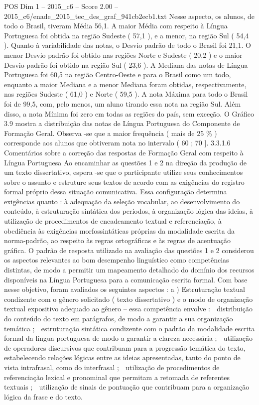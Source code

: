 \begin{textsample}{POS Dim 1 – 2015\_c6 – Score 2.00 – 2015\_c6/enade\_2015\_tec\_des\_graf\_941cb2ecb1.txt}
Nesse aspecto, os alunos, de todo o Brasil, tiveram Média 56,1.
A maior Média com respeito à Língua Portuguesa foi obtida na região Sudeste ( 57,1 ), e a menor, na região Sul ( 54,4 ).
Quanto à variabilidade das notas, o Desvio padrão de todo o Brasil foi 21,1.
O menor Desvio padrão foi obtido nas regiões Norte e Sudeste ( 20,2 ) e o maior Desvio padrão foi obtido na região Sul ( 23,6 ).
A Mediana das notas de Língua Portuguesa foi 60,5 na região Centro-Oeste e para o Brasil como um todo, enquanto a maior Mediana e a menor Mediana foram obtidas, respectivamente, nas regiões Sudeste ( 61,0 ) e Norte ( 59,5 ).
A nota Máxima para todo o Brasil foi de 99,5, com, pelo menos, um aluno tirando essa nota na região Sul.
Além disso, a nota Mínima foi zero em todas as regiões do país, sem exceção.
O Gráfico 3.9 mostra a distribuição das notas de Língua Portuguesa do Componente de Formação Geral.
Observa -se que a maior frequência ( mais de 25 \% ) corresponde aos alunos que obtiveram nota no intervalo ( 60 ; 70 ]. 3.3.1.6 Comentários sobre a correção das respostas de Formação Geral com respeito à Língua Portuguesa Ao encaminhar as questões 1 e 2 na direção da produção de um texto dissertativo, espera -se que o participante utilize seus conhecimentos sobre o assunto e estruture seus textos de acordo com as exigências do registro formal próprio dessa situação comunicativa.
Essa configuração determina exigências quanto : à adequação da seleção vocabular, ao desenvolvimento do conteúdo, à estruturação sintática dos períodos, à organização lógica das ideias, à utilização de procedimentos de encadeamento textual e referenciação, à obediência às exigências morfossintáticas próprias da modalidade escrita da norma-padrão, ao respeito às regras ortográficas e às regras de acentuação gráfica.
O padrão de resposta utilizado na avaliação das questões 1 e 2 considerou os aspectos relevantes ao bom desempenho linguístico como competências distintas, de modo a permitir um mapeamento detalhado do domínio dos recursos disponíveis na Língua Portuguesa para a comunicação escrita formal.
Com base nesse objetivo, foram avaliados os seguintes aspectos : a ) Estruturação textual condizente com o gênero solicitado ( texto dissertativo ) e o modo de organização textual expositivo adequado ao gênero – essa competência envolve :  distribuição do conteúdo do texto em parágrafos, de modo a garantir a sua organização temática ;  estruturação sintática condizente com o padrão da modalidade escrita formal da língua portuguesa de modo a garantir a clareza necessária ;  utilização de operadores discursivos que contribuam para a progressão temática do texto, estabelecendo relações lógicas entre as ideias apresentadas, tanto do ponto de vista intrafrasal, como do interfrasal ;  utilização de procedimentos de referenciação lexical e pronominal que permitam a retomada de referentes textuais ;  utilização de sinais de pontuação que contribuam para a organização lógica da frase e do texto.

\end{textsample}
